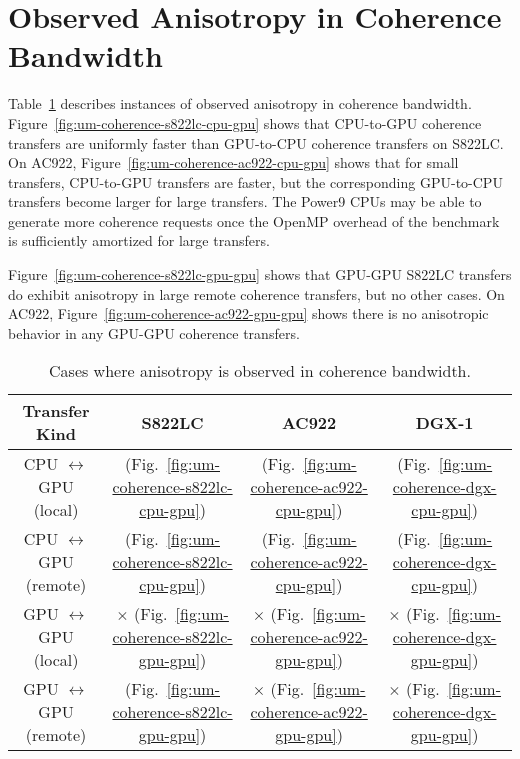 \section{Observed Anisotropy in Coherence Bandwidth}

Table~\ref{tab:um-coherence-anisotropy} describes instances of observed anisotropy in coherence bandwidth.
Figure~\ref{fig:um-coherence-s822lc-cpu-gpu} shows that CPU-to-GPU coherence transfers are uniformly faster than GPU-to-CPU coherence transfers on S822LC.
On AC922, Figure~\ref{fig:um-coherence-ac922-cpu-gpu} shows that for small transfers, CPU-to-GPU transfers are faster, but the corresponding GPU-to-CPU transfers become larger for large transfers.
The Power9 CPUs may be able to generate more coherence requests once the OpenMP overhead of the benchmark is sufficiently amortized for large transfers.

Figure~\ref{fig:um-coherence-s822lc-gpu-gpu} shows that GPU-GPU S822LC transfers do exhibit anisotropy in large remote coherence transfers, but no other cases.
On AC922, Figure~\ref{fig:um-coherence-ac922-gpu-gpu} shows there is no anisotropic behavior in any GPU-GPU coherence transfers.

\begin{table}[ht]
	\centering
	\caption[Anisotropy in Coherence Bandwidth]{
		Cases where anisotropy is observed in coherence bandwidth.
	}
	\label{tab:um-coherence-anisotropy}
	\begin{tabular}{cccc}
		\hline
		\textbf{Transfer Kind}             & \textbf{S822LC}                                         & \textbf{AC922}                                         & \textbf{DGX-1}                            \\ \hline 
		CPU $\leftrightarrow$ GPU (local)  & \checkmark (Fig.~\ref{fig:um-coherence-s822lc-cpu-gpu}) & \checkmark (Fig.~\ref{fig:um-coherence-ac922-cpu-gpu}) & \checkmark (Fig.~\ref{fig:um-coherence-dgx-cpu-gpu}) \\ \hline
		CPU $\leftrightarrow$ GPU (remote) & \checkmark (Fig.~\ref{fig:um-coherence-s822lc-cpu-gpu}) & \checkmark (Fig.~\ref{fig:um-coherence-ac922-cpu-gpu}) & \checkmark (Fig.~\ref{fig:um-coherence-dgx-cpu-gpu}) \\ \hline
		GPU $\leftrightarrow$ GPU (local)  & $\times$   (Fig.~\ref{fig:um-coherence-s822lc-gpu-gpu}) & $\times$   (Fig.~\ref{fig:um-coherence-ac922-gpu-gpu}) & $\times$ (Fig.~\ref{fig:um-coherence-dgx-gpu-gpu}) \\ \hline
		GPU $\leftrightarrow$ GPU (remote) & \checkmark (Fig.~\ref{fig:um-coherence-s822lc-gpu-gpu}) & $\times$   (Fig.~\ref{fig:um-coherence-ac922-gpu-gpu}) & $\times$ (Fig.~\ref{fig:um-coherence-dgx-gpu-gpu}) \\ \hline
	\end{tabular}
\end{table}

